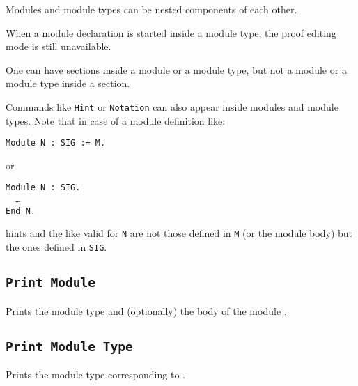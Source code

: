 \begin{Remarks}
\item Modules and module types can be nested components of each other.
\item When a module declaration is started inside a module type,
  the proof editing mode is still unavailable.
\item One can have sections inside a module or a module type, but
  not a module or a module type inside a section.
\item Commands like \texttt{Hint} or \texttt{Notation} can
  also appear inside modules and module types. Note that in case of a
  module definition like:

    \medskip
    \noindent
    {\tt Module N : SIG := M.} 
    \medskip

    or

    \medskip
    {\tt Module N : SIG.\\
      \ \ \dots\\
      End N.}
    \medskip 
    
    hints and the like valid for \texttt{N} are not those defined in
    \texttt{M} (or the module body) but the ones defined in
    \texttt{SIG}.

\end{Remarks}

\subsection{\tt Print Module {\ident}}
Prints the module type and (optionally) the body of the module {\ident}.

\subsection{\tt Print Module Type {\ident}}
Prints the module type corresponding to {\ident}.


